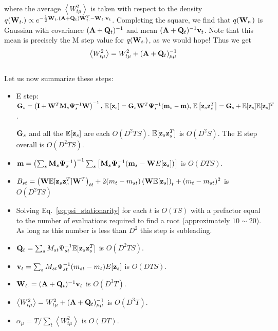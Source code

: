 \documentclass[nofootinbib,amssymb,amsmath]{revtex4}
\newcommand{\ave}[1]{\left\langle #1 \right\rangle}
\newcommand{\vI}{{\bf I}}
\newcommand{\vv}{{\bf v}}
\newcommand{\vz}{{\bf z}}
\newcommand{\vm}{{\bf m}}
\newcommand{\vG}{{\bf G}}
\newcommand{\vQ}{{\bf Q}}
\newcommand{\vM}{{\bf M}}
\newcommand{\vW}{{\bf W}}
\newcommand{\vPsi}{{\bf \Psi}}
\newcommand{\vA}{{\bf A}}
\newcommand{\EE}{\mathbb{E}}
\begin{document}
where the average $\ave{W_{t\mu}^2}$ is taken with respect to the density $q(\vW_{t \cdot}) \propto e^{-\frac{1}{2} \vW_{t \cdot} (\vA + \vQ_t) \vW_{t \cdot}^T - \vW_{t \cdot} \vv_t}$.  Completing the square, we find that $q(\vW_{t \cdot})$ is Gaussian with covariance $(\vA + \vQ_t)^{-1}$ and mean $(\vA + \vQ_t)^{-1} \vv_t$.  Note that this mean is precisely the M step value for $q(\vW_{t \cdot})$, as we would hope!  Thus we get
%
\begin{equation}
\ave{W_{t\mu}^2} = W_{t\mu}^2 + (\vA + \vQ_t)^{-1}_{\mu\mu}
\end{equation}\\
%

\noindent Let us now summarize these steps:
\begin{itemize}
\item E step: $\vG_s = \left( \vI + \vW^T \vM_s \vPsi_s^{-1} \vW \right)^{-1}, \,
\EE \left[ \vz_s \right] = \vG_s \vW^T \vPsi_s^{-1} (\vm_s - \vm), \,
\EE \left[ \vz_s \vz_s^T \right] = \vG_s + \EE[\vz_s] \EE[\vz_s]^T$.

$\vG_s$ and all the $\EE[\vz_s]$ are each $O(D^2 T S)$. $\EE[\vz_s \vz_s^T]$ is $O(D^2 S)$.  The E step overall is $O(D^2 T S)$.

\item $\vm = \left( \sum_s \vM_s \vPsi_{s}^{-1} \right)^{-1} \sum_s \left[ \vM_s \vPsi_{s}^{-1}  (\vm_{s}  - \vW  E[\vz_{s}] ) \right]$ is $O(D T S)$.

\item  $ B_{st} =\left( \vW \EE[\vz_s \vz_s^T] \vW^T \right)_{tt} +2 (m_t - m_{st}) \left( \vW \EE[\vz_s] \right)_t + (m_t - m_{st})^2$ is $O(D^2 T S)$

\item Solving Eq.~\eqref{eq:psi_stationarity} for each $t$ is $O(T S)$ with a prefactor equal to the number of evaluations required to find a root (approximately $10 \sim 20$). As long as this number is less than $D^2$ this step is subleading.

\item $\vQ_t = \sum_s M_{st} \Psi_{st}^{-1} \EE[\vz_s \vz_s^T]$ is $O(D^2 T S)$.

\item $\vv_t = \sum_s M_{st} \Psi_{st}^{-1} (m_{st} - m_t)E[\vz_s ]$ is $O(D T S)$.

\item $ \vW_{t \cdot} = (\vA + \vQ_t)^{-1} \vv_t$ is $O(D^3 T)$.

\item $\ave{W_{t\mu}^2} = W_{t\mu}^2 + (\vA + \vQ_t)^{-1}_{\mu\mu}$ is $O(D^3 T)$.

\item $\alpha_\mu = T / \sum_t \ave{W_{t\mu}^2}$ is $O(D T)$.

\end{itemize}
\end{document}
